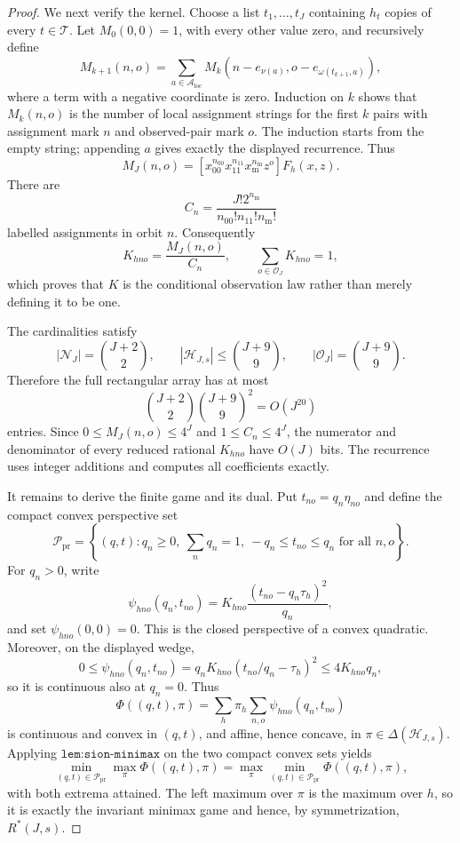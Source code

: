\documentclass{article}
\begin{document}
\begin{proof}
We next verify the kernel. Choose a list \(t_1,\ldots,t_J\) containing \(h_t\) copies of every \(t\in\mathcal T\). Let \(M_0(0,0)=1\), with every other value zero, and recursively define
\[
 M_{k+1}(n,o)=\sum_{a\in\mathcal A_{\mathrm{loc}}}
 M_k\!\left(n-e_{\nu(a)},o-e_{\omega(t_{k+1},a)}\right),
\]
where a term with a negative coordinate is zero. Induction on \(k\) shows that \(M_k(n,o)\) is the number of local assignment strings for the first \(k\) pairs with assignment mark \(n\) and observed-pair mark \(o\). The induction starts from the empty string; appending \(a\) gives exactly the displayed recurrence. Thus
\[
 M_J(n,o)=
 [x_{00}^{n_{00}}x_{11}^{n_{11}}x_{\mathrm m}^{n_{\mathrm m}}z^o]F_h(x,z).
\]
There are
\[
 C_n=\frac{J!2^{n_{\mathrm m}}}{n_{00}!n_{11}!n_{\mathrm m}!}
\]
labelled assignments in orbit \(n\). Consequently
\[
 K_{hno}=\frac{M_J(n,o)}{C_n},
 \qquad
 \sum_{o\in\mathcal O_J}K_{hno}=1,
\]
which proves that \(K\) is the conditional observation law rather than merely defining it to be one.

The cardinalities satisfy
\[
 |\mathcal N_J|={J+2\choose2},\qquad
 |\mathcal H_{J,s}|\le {J+9\choose9},\qquad
 |\mathcal O_J|={J+9\choose9}.
\]
Therefore the full rectangular array has at most
\[
 {J+2\choose2}{J+9\choose9}^{\!2}=O(J^{20})
\]
entries. Since \(0\le M_J(n,o)\le4^J\) and \(1\le C_n\le4^J\), the numerator and denominator of every reduced rational \(K_{hno}\) have \(O(J)\) bits. The recurrence uses integer additions and computes all coefficients exactly.

It remains to derive the finite game and its dual. Put \(t_{no}=q_n\eta_{no}\) and define the compact convex perspective set
\[
 \mathcal P_{\mathrm{pr}}=
 \left\{(q,t):q_n\ge0,\ \sum_nq_n=1,\ -q_n\le t_{no}\le q_n
 \text{ for all }n,o\right\}.
\]
For \(q_n>0\), write
\[
 \psi_{hno}(q_n,t_{no})
 =K_{hno}\frac{(t_{no}-q_n\tau_h)^2}{q_n},
\]
and set \(\psi_{hno}(0,0)=0\). This is the closed perspective of a convex quadratic. Moreover, on the displayed wedge,
\[
 0\le \psi_{hno}(q_n,t_{no})
 =q_nK_{hno}(t_{no}/q_n-\tau_h)^2
 \le4K_{hno}q_n,
\]
so it is continuous also at \(q_n=0\). Thus
\[
 \Phi((q,t),\pi)=\sum_h\pi_h\sum_{n,o}\psi_{hno}(q_n,t_{no})
\]
is continuous and convex in \((q,t)\), and affine, hence concave, in \(\pi\in\Delta(\mathcal H_{J,s})\). Applying \(\texttt{lem:sion-minimax}\) on the two compact convex sets yields
\[
 \min_{(q,t)\in\mathcal P_{\mathrm{pr}}}\max_{\pi}\Phi((q,t),\pi)
 =\max_{\pi}\min_{(q,t)\in\mathcal P_{\mathrm{pr}}}\Phi((q,t),\pi),
\]
with both extrema attained. The left maximum over \(\pi\) is the maximum over \(h\), so it is exactly the invariant minimax game and hence, by symmetrization, \(R^*(J,s)\).


\end{proof}
\end{document}

